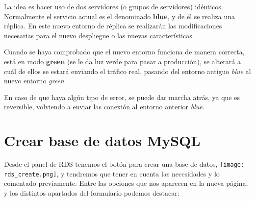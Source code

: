 La idea es hacer uso de dos servidores (o grupos de servidores) idénticos. Normalmente el servicio actual es el denominado \textbf{blue}, y de él se realiza una réplica. En este nuevo entorno de réplica se realizarán las modificaciones necesarias para el nuevo despliegue o las nuevas características.

Cuando se haya comprobado que el nuevo entorno funciona de manera correcta, está en modo \textbf{green} (se le da luz verde para pasar a producción), se alterará a cuál de ellos se estará enviando el tráfico real, pasando del entorno antiguo \textit{blue} al nuevo entorno \textit{green}.

En caso de que haya algún tipo de error, se puede dar marcha atrás, ya que es reversible, volviendo a enviar las conexión al entorno anterior \textit{blue}.


\chapter{Crear base de datos MySQL}

Desde el panel de RDS tenemos el botón para crear una base de datos,  \texttt{[image: rds\_create.png]}, y tendremos que tener en cuenta las necesidades y lo comentado previamente. Entre las opciones que nos aparecen en la nueva página, y los distintos apartados del formulario podemos destacar:

